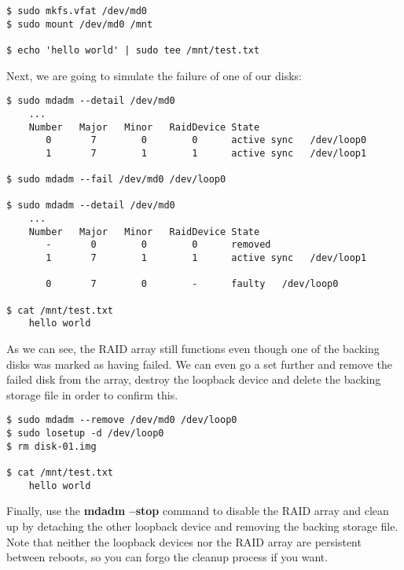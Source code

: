 \begin{lstlisting}[style=bashstyle]
$ sudo mkfs.vfat /dev/md0
$ sudo mount /dev/md0 /mnt

$ echo 'hello world' | sudo tee /mnt/test.txt
\end{lstlisting}

Next, we are going to simulate the failure of one of our disks:

\begin{lstlisting}[style=bashstyle]
$ sudo mdadm --detail /dev/md0
    ...
    Number   Major   Minor   RaidDevice State
       0       7        0        0      active sync   /dev/loop0
       1       7        1        1      active sync   /dev/loop1

$ sudo mdadm --fail /dev/md0 /dev/loop0

$ sudo mdadm --detail /dev/md0
    ...
    Number   Major   Minor   RaidDevice State
       -       0        0        0      removed
       1       7        1        1      active sync   /dev/loop1

       0       7        0        -      faulty   /dev/loop0

$ cat /mnt/test.txt
    hello world
\end{lstlisting}

As we can see, the RAID array still functions even though one of the backing
disks was marked as having failed. We can even go a set further and remove the
failed disk from the array, destroy the loopback device and delete the backing
storage file in order to confirm this.

\begin{lstlisting}[style=bashstyle]
$ sudo mdadm --remove /dev/md0 /dev/loop0
$ sudo losetup -d /dev/loop0
$ rm disk-01.img

$ cat /mnt/test.txt
    hello world
\end{lstlisting}

Finally, use the \textbf{mdadm --stop} command to disable the RAID array and
clean up by detaching the other loopback device and removing the backing storage
file. Note that neither the loopback devices nor the RAID array are persistent
between reboots, so you can forgo the cleanup process if you want.

